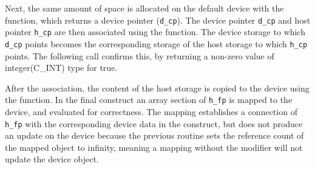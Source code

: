 Next, the same amount of space is allocated on the default device with
the  function, which returns a device pointer (\texttt{d\_cp}).
The device pointer \texttt{d\_cp} and host pointer \texttt{h\_cp}
are then associated using the  function.
The device storage to which \texttt{d\_cp} points becomes the corresponding storage of
the host storage to which \texttt{h\_cp} points.
The following  call confirms this, by returning
a non-zero value of integer(C\_INT) type for true.

After the association, the content of the  host storage
is copied to the device using the  function.
In the final  construct an array section of \texttt{h\_fp} 
is mapped to the device, and evaluated for correctness.
The mapping establishes a connection of \texttt{h\_fp} with
the corresponding device data in the  construct,
but does not produce an update on the device because the previous  routine sets the 
reference count of the mapped object to infinity, meaning a mapping 
without the  modifier will not 
update the device object.

